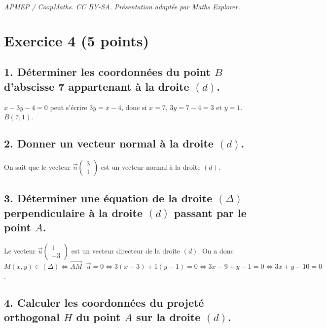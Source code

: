 \documentclass[10pt]{article}
\begin{document}
\noindent\textit{APMEP / CoopMaths. CC BY-SA. Présentation adaptée par Maths Explorer.}\par\medskip
\section*{Exercice 4 (5 points)}
	
	\subsection*{1. Déterminer les coordonnées du point $B$ d’abscisse 7 appartenant à la droite $(d)$.}
	
$x - 3y - 4 = 0$ peut s’écrire $3y = x - 4$, donc si $x = 7$, $3y = 7 - 4 = 3$ et $y = 1$. $B(7, 1)$.
	
	\subsection*{2. Donner un vecteur normal à la droite $(d)$.}
	
On sait que le vecteur $\overrightarrow{n} \left( \begin{array}{c} 3 \\ 1 \end{array} \right)$ est un vecteur normal à la droite $(d)$.
	
	\subsection*{3. Déterminer une équation de la droite $(\Delta)$ perpendiculaire à la droite $(d)$ passant par le point $A$.}
	
Le vecteur $\overrightarrow{u} \left( \begin{array}{c} 1 \\ -3 \end{array} \right)$ est un vecteur directeur de la droite $(d)$. On a donc $M(x, y) \in (\Delta) \Leftrightarrow \overrightarrow{AM} \cdot \overrightarrow{u} = 0 \Leftrightarrow 3(x - 3) + 1(y - 1) = 0 \Leftrightarrow 3x - 9 + y - 1 = 0 \Leftrightarrow 3x + y - 10 = 0$.
	
	\subsection*{4. Calculer les coordonnées du projeté orthogonal $H$ du point $A$ sur la droite $(d)$.}
	
\end{document}
